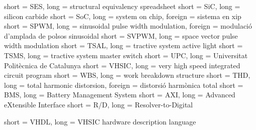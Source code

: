     { short = SES,     long = structural equivalency spreadsheet }
    { short = SiC,     long = silicon carbide }
    { short = SoC,     long = system on chip, foreign = sistema en xip }
   { short = SPWM,    long = sinusoidal pulse width modulation, foreign = modulació d'amplada de polsos sinusoidal}
  { short = SVPWM,   long = space vector pulse width modulation }
   { short = TSAL,    long = tractive system active light }
   { short = TSMS,    long = tractive system master switch }
    { short = UPC,     long = Universitat Politècnica de Catalunya }
  { short = VHSIC,   long = very high speed integrated circuit program }
    { short = WBS,     long = work breakdown structure }
    { short = THD,     long = total harmonic distorsion, foreign = distorsió harmònica total}
    { short = BMS,     long = Battery Management System }
    { short = AXI,     long = Advanced eXtensible Interface }
    { short = R/D,     long = Resolver-to-Digital }

   { short = VHDL,    long = \ac{VHSIC} hardware description language }